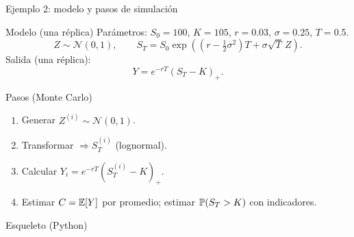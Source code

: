 \documentclass[aspectratio=1610, 9pt]{beamer}
\begin{document}
\begin{frame}[fragile]{Ejemplo 2: modelo y pasos de simulación}
\small
\begin{block}{Modelo (una réplica)}
Parámetros: $S_0=100$, $K=105$, $r=0.03$, $\sigma=0.25$, $T=0.5$.
\[
Z\sim\mathcal{N}(0,1),\qquad
S_T=S_0\exp\!\left((r-\tfrac12\sigma^2)T+\sigma\sqrt{T}\,Z\right).
\]
Salida (una réplica):
\[
Y=e^{-rT}(S_T-K)_+.
\]
\end{block}

\begin{block}{Pasos (Monte Carlo)}
\begin{enumerate}
\item Generar $Z^{(i)}\sim\mathcal{N}(0,1)$.
\item Transformar $\Rightarrow S_T^{(i)}$ (lognormal).
\item Calcular $Y_i=e^{-rT}(S_T^{(i)}-K)_+$.
\item Estimar $C=\mathbb{E}[Y]$ por promedio; estimar $\mathbb{P}(S_T>K)$ con indicadores.
\end{enumerate}
\end{block}

\begin{block}{Esqueleto (Python)}
\end{block}
\end{frame}
\end{document}
